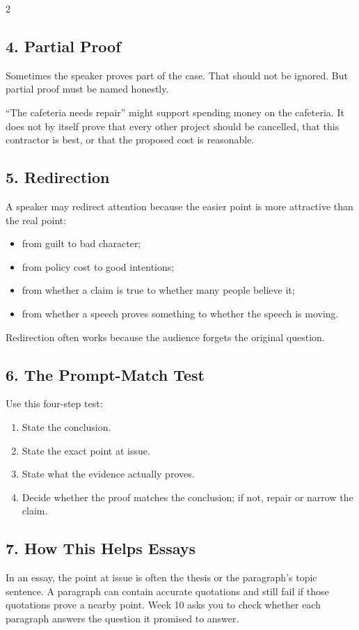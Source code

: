 \documentclass[12pt]{article}
\begin{document}
\begin{multicols}{2}
\subsection*{4. Partial Proof}
Sometimes the speaker proves part of the case. That should not be ignored. But partial proof must be named honestly.

``The cafeteria needs repair'' might support spending money on the cafeteria. It does not by itself prove that every other project should be cancelled, that this contractor is best, or that the proposed cost is reasonable.

\subsection*{5. Redirection}
A speaker may redirect attention because the easier point is more attractive than the real point:
\begin{itemize}[leftmargin=*]
\item from guilt to bad character;
\item from policy cost to good intentions;
\item from whether a claim is true to whether many people believe it;
\item from whether a speech proves something to whether the speech is moving.
\end{itemize}
Redirection often works because the audience forgets the original question.

\subsection*{6. The Prompt-Match Test}
Use this four-step test:
\begin{enumerate}[leftmargin=*,itemsep=0.12em]
\item State the conclusion.
\item State the exact point at issue.
\item State what the evidence actually proves.
\item Decide whether the proof matches the conclusion; if not, repair or narrow the claim.
\end{enumerate}

\subsection*{7. How This Helps Essays}
In an essay, the point at issue is often the thesis or the paragraph's topic sentence. A paragraph can contain accurate quotations and still fail if those quotations prove a nearby point. Week 10 asks you to check whether each paragraph answers the question it promised to answer.


\end{multicols}
\end{document}
